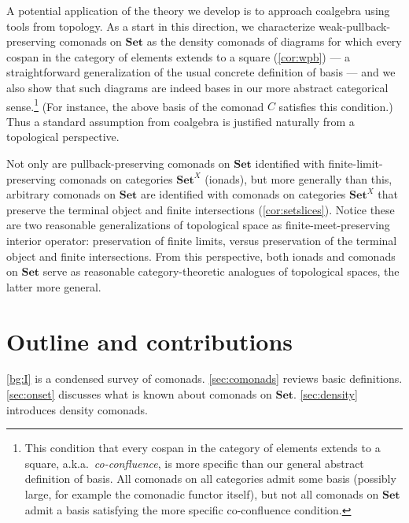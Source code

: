 \documentclass[11pt, oneside, article]{memoir}
\theoremstyle{plain}
\theoremstyle{definition}
\theoremstyle{remark}
\newcommand{\namedcat}[1]{\mathbf{#1}}
\newcommand{\Set}{\namedcat{Set}}
\newcommand{\cmnd}[1]{{#1}}
\newcommand{\xX}{X}
\newcommand{\cC}{\cmnd{C}}
\begin{document}
A potential application of the theory we develop is to approach
coalgebra using tools from topology. As a start in this direction, we
characterize weak-pullback-preserving comonads on $\Set$ as the
density comonads of diagrams for which every cospan in the category of
elements extends to a square (\cref{cor:wpb}) --- a straightforward
generalization of the usual concrete definition of basis --- and we
also show that such diagrams are indeed bases in our more abstract
categorical sense.\footnote{This condition that every cospan in the
  category of elements extends to a square, a.k.a.\
  \emph{co-confluence}, is more specific than our general abstract
  definition of basis. All comonads on all categories admit some basis
  (possibly large, for example the comonadic functor itself), but not
  all comonads on $\Set$ admit a basis satisfying the more specific
  co-confluence condition.} (For instance, the above basis of the
comonad $\cC$ satisfies this condition.) Thus a standard assumption
from coalgebra is justified naturally from a topological perspective.


Not only are pullback-preserving comonads on $\Set$ identified with
finite-limit-preserving comonads on categories $\Set^\xX$ (ionads),
but more generally than this, arbitrary comonads on $\Set$ are
identified with comonads on categories $\Set^\xX$ that preserve the
terminal object and finite intersections
(\cref{cor:setslices}). Notice these are two reasonable
generalizations of topological space as finite-meet-preserving
interior operator: preservation of finite limits, versus preservation
of the terminal object and finite intersections. From this
perspective, both ionads and comonads on $\Set$ serve as reasonable
category-theoretic analogues of topological spaces, the latter more
general.

\section*{Outline and contributions}

\cref{bg:I} is a condensed survey of comonads.  \cref{sec:comonads}
reviews basic definitions. \cref{sec:onset} discusses what is known
about comonads on $\Set$. \cref{sec:density} introduces density
comonads.
\end{document}
